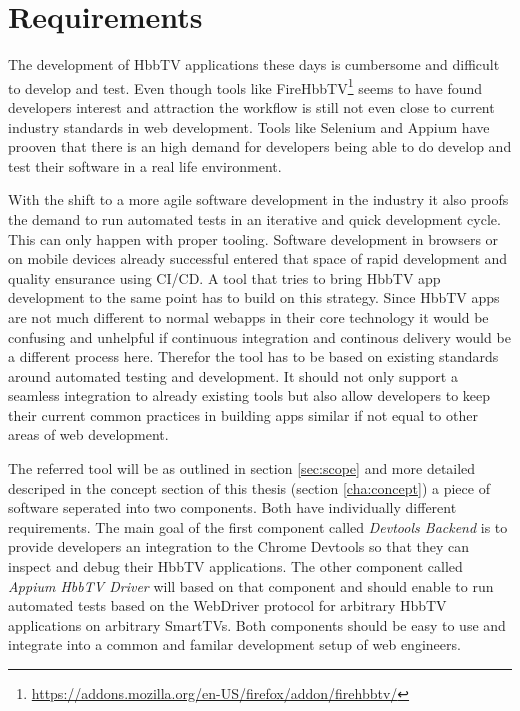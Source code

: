 \chapter{Requirements\label{cha:chapter3}}

The development of HbbTV applications these days is cumbersome and difficult to develop and test.
Even though tools like FireHbbTV\footnote{\url{https://addons.mozilla.org/en-US/firefox/addon/firehbbtv/}}
seems to have found developers interest and attraction the workflow is still not even close to
current industry standards in web development. Tools like Selenium and Appium have prooven that
there is an high demand for developers being able to do develop and test their software in a real
life environment.

With the shift to a more agile software development in the industry it also proofs the demand
to run automated tests in an iterative and quick development cycle. This can only happen
with proper tooling. Software development in browsers or on mobile devices already successful
entered that space of rapid development and quality ensurance using CI/CD. A tool that
tries to bring HbbTV app development to the same point has to build on this strategy. Since
HbbTV apps are not much different to normal webapps in their core technology it would be confusing
and unhelpful if continuous integration and continous delivery would be a different process here.
Therefor the tool has to be based on existing standards around automated testing and development.
It should not only support a seamless integration to already existing tools but also allow
developers to keep their current common practices in building apps similar if not equal to other
areas of web development.

The referred tool will be as outlined in section \ref{sec:scope} and more detailed descriped in
the concept section of this thesis (section \ref{cha:concept}) a piece of software seperated
into two components. Both have individually different requirements. The main goal of the first
component called \textit{Devtools Backend} is to provide developers an integration to the
Chrome Devtools so that they can inspect and debug their HbbTV applications. The other
component called \textit{Appium HbbTV Driver} will based on that component and should enable
to run automated tests based on the WebDriver protocol for arbitrary HbbTV applications on
arbitrary SmartTVs. Both components should be easy to use and integrate into a common and
familar development setup of web engineers.

